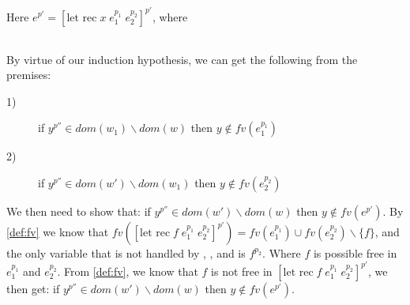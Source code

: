 \item[\runa{Let-rec}] Here $e^{p'}=[\mbox{let rec}\;x\;e_1^{p_1}\;e_2^{p_2}]^{p'}$, where
\begin{figure}[H]
	\setlength\tabcolsep{8pt}
	\begin{tabular}{l}
		
	\end{tabular}
\end{figure}
By virtue of our induction hypothesis, we can get the following from the premises:
\begin{description}
	\item[1)] if $y^{p''}\in dom(w_1)\backslash dom(w)$ then $y\notin fv(e_1^{p_1})$
	\item[2)] if $y^{p''}\in dom(w')\backslash dom(w_1)$ then $y\notin fv(e_2^{p_2})$
\end{description}
We then need to show that: if $y^{p''}\in dom(w')\backslash dom(w)$ then $y\notin fv(e^{p'})$.
By \cref{def:fv} we know that $fv([\mbox{let rec}\;f\;e_1^{p_1}\;e_2^{p_2}]^{p'})=fv(e_1^{p_1})\cup fv(e_2^{p_2})\backslash\{f\}$, and the only variable that is not handled by , , and  is $f^{p_2}$.
Where $f$ is possible free in $e_1^{p_1}$ and $e_2^{p_2}$.
From \cref{def:fv}, we know that $f$ is not free in $[\mbox{let rec}\;f\;e_1^{p_1}\;e_2^{p_2}]^{p'}$, we then get: if $y^{p''}\in dom(w')\backslash dom(w)$ then $y\notin fv(e^{p'})$.
